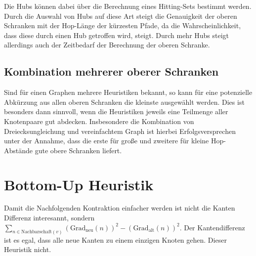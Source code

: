 Die Hubs können dabei über die Berechnung eines Hitting-Sets bestimmt werden.
Durch die Auswahl von Hubs auf diese Art steigt die Genauigkeit der oberen Schranken mit der Hop-Länge der kürzesten Pfade, da die Wahrscheinlichkeit, dass diese durch einen Hub getroffen wird, steigt.
Durch mehr Hubs steigt allerdings auch der Zeitbedarf der Berechnung der oberen Schranke.

\subsection{Kombination mehrerer oberer Schranken}
Sind für einen Graphen mehrere Heuristiken bekannt, so kann für eine potenzielle Abkürzung aus allen oberen Schranken die kleinste ausgewählt werden.
Dies ist besonders dann sinnvoll, wenn die Heuristiken jeweils eine Teilmenge aller Knotenpaare gut abdecken.
Insbesondere die Kombination von Dreiecksungleichung und vereinfachtem Graph ist hierbei Erfolgsversprechen unter der Annahme, dass die erste für große und zweitere für kleine Hop-Abstände gute obere Schranken liefert.

\section{Bottom-Up Heuristik}


Damit die Nachfolgenden Kontraktion einfacher werden ist nicht die Kanten Differenz interesannt, sondern $\sum_{n \in \text{Nachbarschaft}(v)} (\text{Grad}_\text{neu}(n))^2 - (\text{Grad}_\text{alt}(n))^2$.
Der Kantendifferenz ist es egal, dass alle neue Kanten zu einem einzigen Knoten gehen. Dieser Heuristik nicht.

